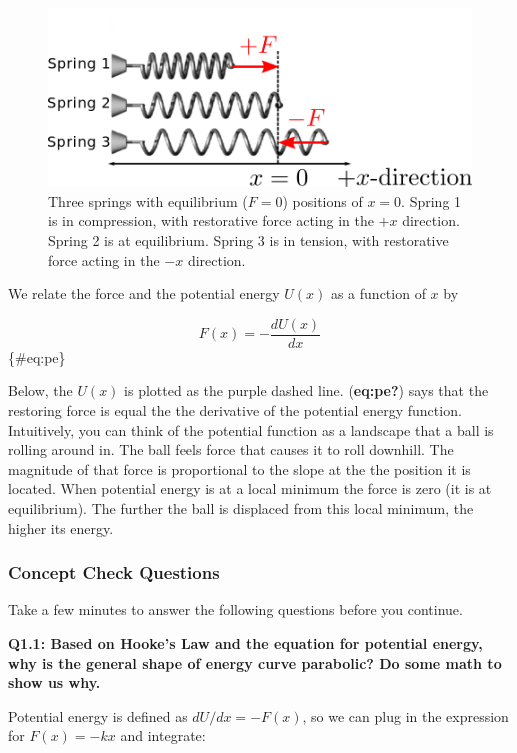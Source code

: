 \documentclass{book}
\begin{document}
\begin{figure}
\hypertarget{fig:SpringSystem}{%
\centering
\includegraphics{images/figures/SpringSystem.png}
\caption{Three springs with equilibrium (\(F=0\)) positions of \(x=0\). Spring
1 is in compression, with restorative force acting in the \(+x\) direction.
Spring 2 is at equilibrium. Spring 3 is in tension, with restorative force
acting in the \(-x\) direction.}\label{fig:SpringSystem}
}
\end{figure}

We relate the force and the potential energy \(U(x)\) as a function of \(x\)
by

\[
 F(x) = - \frac{dU(x)}{dx}
\]\{\#eq:pe\}

Below, the \(U(x)\) is plotted as the purple dashed line. (\textbf{eq:pe?})
says that the restoring force is equal the the derivative of the potential
energy function. Intuitively, you can think of the potential function as a
landscape that a ball is rolling around in. The ball feels force that causes
it to roll downhill. The magnitude of that force is proportional to the slope
at the the position it is located. When potential energy is at a local minimum
the force is zero (it is at equilibrium). The further the ball is displaced
from this local minimum, the higher its energy.

\hypertarget{concept-check-questions}{%
\subsubsection{Concept Check Questions}\label{concept-check-questions}}

Take a few minutes to answer the following questions before you continue.

\textbf{Q1.1: Based on Hooke's Law and the equation for potential energy, why
is the general shape of energy curve parabolic? Do some math to show us why.}

Potential energy is defined as \(dU/dx = -F(x)\), so we can plug in the
expression for \(F(x) = -kx\) and integrate:
\end{document}
